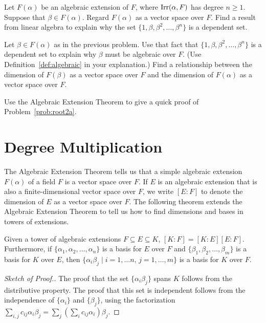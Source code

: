 \begin{problem}
Let $F(\alpha)$ be an algebraic extension of $F$, where $\operatorname{Irr}(\alpha, F)$ has degree $n\geq 1$.  Suppose that $\beta \in F(\alpha)$.  Regard $F(\alpha)$ as a vector space over $F$. Find a result from linear algebra to explain why the set $\{1, \beta, \beta^2, \ldots, \beta^n\}$ is a dependent set.
\end{problem}



\begin{problem}
Let $\beta \in F(\alpha)$ as in the previous problem.
Use that fact that $\{1, \beta, \beta^2, \ldots, \beta^n\}$ is a dependent set to explain why $\beta$ must be algebraic over $F$. (Use Definition~\ref{def:algebraic} in your explanation.) Find a relationship between the dimension of $F(\beta)$ as a vector space over $F$ and the dimension of $F(\alpha)$ as a vector space over $F$.
\end{problem}



\begin{problem}
    Use the Algebraic Extension Theorem to give a quick proof of Problem~\ref{prob:root2a}.
\end{problem}


\section{Degree Multiplication}

The Algebraic Extension Theorem tells us that a simple algebraic extension $F(\alpha)$ of a field $F$ is a vector space over $F$. If $E$ is an algebraic extension that is also a finite-dimensional vector space over $F$, we write $[E : F]$ to denote the dimension of $E$ as a vector space over $F$. The following theorem extends the Algebraic Extension Theorem to tell us how to find dimensions and bases in towers of extensions.

\begin{theorem}\label{thm:degmult}
    Given a tower of algebraic extensions $F \subseteq E \subseteq K$, $[K:F]=[K:E][E:F]$. Furthermore, if $\{\alpha_1,\alpha_2,\ldots,\alpha_n\}$ is a basis for $E$ over $F$ and $\{\beta_1,\beta_2,\ldots,\beta_m\}$ is a basis for $K$ over $E$, then $\{\alpha_i\beta_j \mid i=1,\ldots n,\, j=1,\ldots,m \}$ is a basis for $K$ over $F$.
\end{theorem}

\begin{proof}[Sketch of Proof.]
The proof that the set $\{\alpha_i\beta_j\}$ spans $K$ follows from the distributive property. The proof that this set is independent follows from the independence of $\{\alpha_i\}$ and $\{\beta_j\}$, using the factorization $\sum_{i,j} c_{ij}\alpha_i\beta_j = \sum_j \left( \sum_i c_{ij} \alpha_i \right) \beta_j$.
\end{proof}

